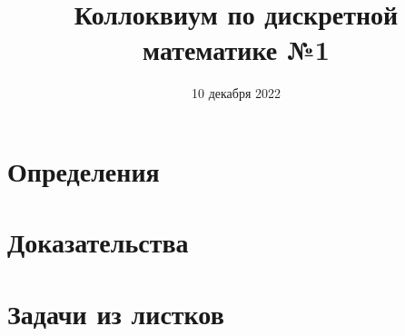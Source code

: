 \documentclass[a4paper]{article}
\title{Коллоквиум по дискретной математике №1}
\author{ %
}
\date{10 декабря 2022}
\begin{document}
	\maketitle
	
	\tableofcontents
	\newpage
	\section{Определения} {
		 
		 
		 
		 
		 
		 
		 
	}
	\newpage
	\section{Доказательства} {
		
		
		
		
		
		
		
		
	}
	\newpage
	\section{Задачи из листков}{
	}
\end{document}
